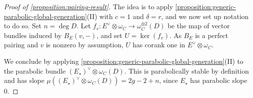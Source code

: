 \documentclass[12 pt]{amsart}
\theoremstyle{plain}
\theoremstyle{definition}
\theoremstyle{remark}
\numberwithin{equation}{section}
\begin{document}
\begin{proof}[Proof of \autoref{proposition:pairing-result}]
The idea is to apply
\autoref{proposition:generic-parabolic-global-generation}(II) with $c =1$ and
$\delta = r$, and we now set up notation to do so.
Set $n=\deg D$. Let $f_v: E^\vee\otimes \omega_C\to \omega_C^{\otimes 2}(D)$ be the map of vector bundles induced by $B_E(v, -)$, and set $U=\ker(f_v)$. 
As $B_E$ is a perfect pairing and $v$ is nonzero by assumption, $U$ has corank one in $E^\vee\otimes \omega_C$.

We conclude by applying \autoref{proposition:generic-parabolic-global-generation}(II) 
to the parabolic bundle $(E_\star)^\vee \otimes
\omega_C(D)$.
This is parabolically stable by definition and
has slope $\mu((E_\star)^\vee \otimes
\omega_C(D)) = 2g - 2+n$,
since $E_\star$ has parabolic slope $0$.


\end{proof}
\end{document}
